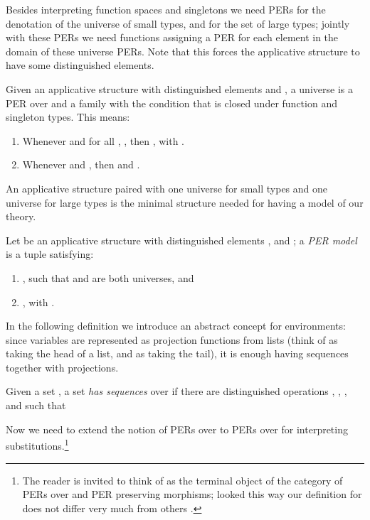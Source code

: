 \documentclass{LMCS}
\begin{document}
{ Besides interpreting function spaces and singletons we need PERs for
the denotation of the universe of small types, and for the set of
large types; jointly with these PERs we need functions assigning a PER
for each element in the domain of these universe PERs. Note that this
forces the applicative structure to have some distinguished elements.


\begin{defi}[Universe]
  Given an applicative structure  with distinguished elements
   and , a universe  is a
  PER  over  and a family 
  with the condition that  is closed under function and 
  singleton types.  This means:
  \begin{enumerate}[(1)]
  \item Whenever  and
    for all , , then , with .
  \item Whenever  and , then  and .
  \end{enumerate}
\end{defi}\medskip

\noindent An applicative structure paired with one universe for small
types and one universe for large types is the minimal structure needed
for having a model of our theory.

\begin{defi}
  Let  be an applicative structure with distinguished 
  elements , and ; a {\em
    PER model} is a tuple  satisfying:
  \begin{enumerate}[(1)]
  \item , such that
     and  are
    both universes, and
  \item , with .
  \end{enumerate}
\end{defi}

In the following definition we introduce an abstract concept for
environments: since variables are represented as projection functions
from lists (think of  as taking the head of a list, and  as
taking the tail), it is enough having sequences together with
projections.

\begin{defi}[Sequences]
  Given a set , a set  \emph{has sequences} over  if
  there are distinguished operations , , ,  and  such that
  
\end{defi}

Now we need to extend the notion of PERs over  to PERs over
 for interpreting substitutions.\footnote{The reader is invited
  to think of  as the terminal object of the category of PERs
  over  and PER preserving morphisms; looked this way our
  definition for  does not differ very much from others
  \cite{aspinall:csl94,coquandPollackTakeyama:fundinf05}.} 

}
\end{document}
